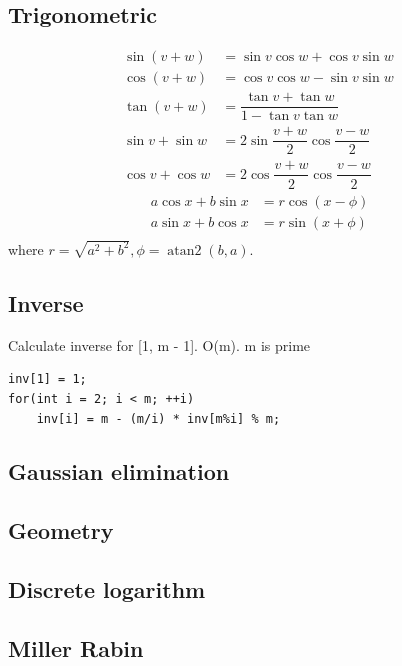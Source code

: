 \documentclass[A4 paper, 12pt, oneside, landscape]{article}
\begin{document}
\begin{multicols}{2}
    \subsection{Trigonometric}
    \begin{align*}
        \sin(v+w)&= \sin v\cos w+\cos v\sin w \\
        \cos(v+w)&=\cos v\cos w-\sin v\sin w\ \\
        \tan(v+w)&=\dfrac{\tan v+\tan w}{1-\tan v\tan w} \\
        \sin v+\sin w&=2\sin\dfrac{v+w}{2}\cos\dfrac{v-w}{2} \\
        \cos v+\cos w&=2\cos\dfrac{v+w}{2}\cos\dfrac{v-w}{2} 
    \end{align*}
    \begin{align*}
        a\cos x+b\sin x&=r\cos(x-\phi)\\
        a\sin x+b\cos x&=r\sin(x+\phi)\\
    \end{align*}
    where $r=\sqrt{a^2+b^2}, \phi=\operatorname{atan2}(b,a)$.

    \subsection{Inverse}
    Calculate inverse for [1, m - 1]. O(m). m is prime
    \begin{lstlisting}
inv[1] = 1;
for(int i = 2; i < m; ++i)
    inv[i] = m - (m/i) * inv[m%i] % m;
    \end{lstlisting}
    
	\subsection{Gaussian elimination}
		    

	\subsection{Geometry}
	
	
	\subsection{Discrete logarithm}
	
	
	\subsection{Miller Rabin}
	


\end{multicols}
\end{document}
